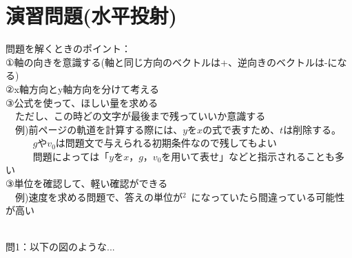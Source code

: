 \documentclass[11pt,twoside]{article}
\begin{document}
	\section{演習問題(水平投射)}
	\begin{shadebox}
		問題を解くときのポイント：\\
			①軸の向きを意識する(軸と同じ方向のベクトルは+、逆向きのベクトルは-になる)\\
			②x軸方向とy軸方向を分けて考える\\
			③公式を使って、ほしい量を求める\\
			　ただし、この時どの文字が最後まで残っていいか意識する\\
			　例)前ページの軌道を計算する際には、$y$を$x$の式で表すため、$t$は削除する。\\
			　　\,\,\,\,\,$g$や$v_0$は問題文で与えられる初期条件なので残してもよい\\
			　　\,\,\,\,\,問題によっては「$y$を$x$，$g$，$v_0$を用いて表せ」などと指示されることも多い\\
			③単位を確認して、軽い確認ができる\\
			　例)速度を求める問題で、答えの単位が\si{\metre\per\second$^2$}になっていたら間違っている可能性が高い
	\end{shadebox}
	　\\
	問1：以下の図のような...
	\clearpage

\end{document}
